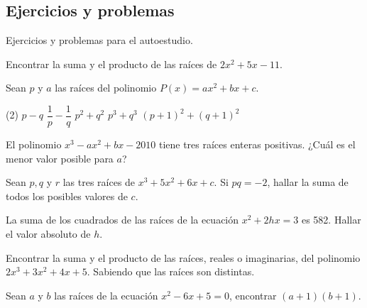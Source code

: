 \subsection{Ejercicios y problemas}

Ejercicios y problemas para el autoestudio.

\showLine
\begin{multicols}{2}

    \begin{exercise}
        Encontrar la suma y el producto de las raíces de $2x^2 + 5x - 11$.
    \end{exercise}

    \begin{exercise}
        Sean $p$ y $a$ las raíces del polinomio $P(x) = ax^2 + bx + c$.
        \begin{tasks}(2)
            \task $p - q$
            \task $\dfrac{1}{p} - \dfrac{1}{q}$
            \task $p^2 + q^2$
            \task $p^3 + q^3$
            \task $(p + 1)^2 + (q + 1)^2$
        \end{tasks}
    \end{exercise}

    \begin{exercise}
        El polinomio $x^3 - ax^2 + bx - 2010$ tiene tres raíces enteras positivas.
        ¿Cuál es el menor valor posible para $a$?
    \end{exercise}

    \begin{exercise}
        Sean $p, q$ y $r$ las tres raíces de $x^3 + 5x^2 + 6x + c$.
        Si $pq = -2$, hallar la suma de todos los posibles valores de $c$.
    \end{exercise}

    \begin{exercise}
        La suma de los cuadrados de las raíces de la ecuación $x^2 + 2hx = 3$ es 582.
        Hallar el valor absoluto de $h$.
    \end{exercise}

    \begin{exercise}
        Encontrar la suma y el producto de las raíces, reales o imaginarias, del polinomio $2x^3 + 3x^2 + 4x + 5$.
        Sabiendo que las raíces son distintas.
    \end{exercise}

    \begin{exercise}
        Sean $a$ y $b$ las raíces de la ecuación $x^2 - 6x + 5 = 0$, encontrar $(a + 1)(b + 1)$.
    \end{exercise}


\end{multicols}
